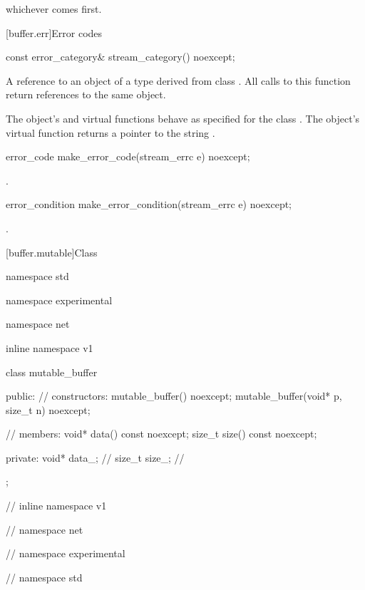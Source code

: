 whichever comes first.




[buffer.err]{Error codes}

\begin{itemdecl}
const error_category& stream_category() noexcept;
\end{itemdecl}

\begin{itemdescr}
\pnum
\returns A reference to an object of a type derived from class . All calls to this function return references to the same object.

\pnum
The object's  and  virtual functions behave as specified for the class . The object's  virtual function returns a pointer to the string .
\end{itemdescr}

\begin{itemdecl}
error_code make_error_code(stream_errc e) noexcept;
\end{itemdecl}

\begin{itemdescr}
\pnum
\returns {}.
\end{itemdescr}

\begin{itemdecl}
error_condition make_error_condition(stream_errc e) noexcept;
\end{itemdecl}

\begin{itemdescr}
\pnum
\returns {}.
\end{itemdescr}



[buffer.mutable]{Class }

\begin{codeblock}
namespace std {
namespace experimental {
namespace net {
inline namespace v1 {

  class mutable_buffer
  {
  public:
    // constructors:
    mutable_buffer() noexcept;
    mutable_buffer(void* p, size_t n) noexcept;

    // members:
    void* data() const noexcept;
    size_t size() const noexcept;

  private:
    void* data_; // \expos
    size_t size_; // \expos
  };

} // inline namespace v1
} // namespace net
} // namespace experimental
} // namespace std
\end{codeblock}

